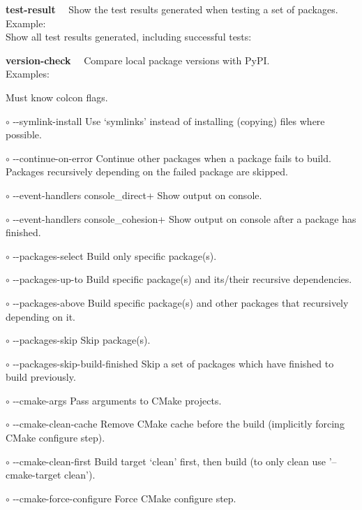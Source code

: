 \documentclass[9pt,a4paper]{article}
\newcommand{\colconcmd}[1]{\textbf{\sffamily\color{blue}#1}~~}
\newcommand{\smallhspace}{\-\hspace{0.3cm}}
\newcommand{\terminalfont}[1]{{\sffamily#1}}
\newcommand{\terminal}[1]{\-\hspace{0.5cm}\terminalfont{\$ #1}}
\newcommand{\ddash}{-{}-}
\begin{document}
\begin{multicols*}{3}[]
\hrulefill

%
\colconcmd{test-result} Show the test results generated when testing a set of packages.
%
\\
Example:
\\
Show all test results generated, including successful tests:\\
\terminal{colcon test-result \ddash all}
%

\hrulefill

%
\colconcmd{version-check} Compare local package versions with PyPI.
\\
Examples:
\\
\terminal{todo}
%

\hrulefill

Must know colcon flags.

$\circ$ \terminalfont{\ddash symlink-install}
\smallhspace
Use `symlinks' instead of installing (copying) files where possible.

$\circ$ \terminalfont{\ddash continue-on-error}
\smallhspace
Continue other packages when a package fails to build.
Packages recursively depending on the failed package are skipped.

$\circ$ \terminalfont{\ddash event-handlers console\_direct+}
\smallhspace
Show output on console.

$\circ$ \terminalfont{\ddash event-handlers console\_cohesion+}
\smallhspace
Show output on console after a package has finished.

$\circ$ \terminalfont{\ddash packages-select}
\smallhspace
Build only specific package(s).

$\circ$ \terminalfont{\ddash packages-up-to}
\smallhspace
Build specific package(s) and its/their recursive dependencies.

$\circ$ \terminalfont{\ddash packages-above}
\smallhspace
Build specific package(s) and other packages that recursively depending on it.

$\circ$ \terminalfont{\ddash packages-skip}
\smallhspace
Skip package(s).

$\circ$ \terminalfont{\ddash packages-skip-build-finished}
\smallhspace
Skip a set of packages which have finished to build previously.

$\circ$ \terminalfont{\ddash cmake-args}
\smallhspace
Pass arguments to CMake projects.

$\circ$ \terminalfont{\ddash cmake-clean-cache}
\smallhspace
Remove CMake cache before the build (implicitly forcing CMake configure step).

$\circ$ \terminalfont{\ddash cmake-clean-first}
\smallhspace
Build target `clean' first, then build (to only clean use '--cmake-target clean').

$\circ$ \terminalfont{\ddash cmake-force-configure}
\smallhspace
Force CMake configure step.

\end{multicols*}
\end{document}
